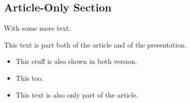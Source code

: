 \subsection<article>{Article-Only Section}
With some more text.
\begin{frame}
This text is part both of the article and of the presentation.
\begin{itemize}
\item This stuff is also shown in both version.
\item This too.
\item<presentation:only@0> This text is also only part of the article.
\end{itemize}
\end{frame}

